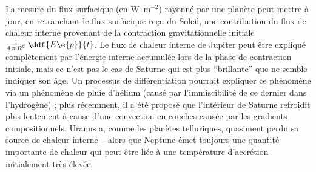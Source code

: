 \sk
La mesure du flux surfacique (en W~m$^{-2}$) 
rayonné par une planète peut mettre à jour, en retranchant 
le flux surfacique reçu du Soleil, une contribution 
du flux de chaleur interne provenant de la contraction
gravitationnelle initiale~$\frac{1}{4\,\pi\,R^2}\,\ddf{E\e{p}}{t}$.
Le flux de chaleur interne de Jupiter peut être
expliqué complètement par l'énergie interne accumulée lors de la phase
de contraction initiale, mais ce n'est pas le cas de Saturne
qui est plus ``brillante'' que ne semble indiquer son âge.
Un processus de différentiation pourrait expliquer ce phénomène
via un phénomène de pluie d'hélium (causé par l'immiscibilité
de ce dernier dans l'hydrogène) ; plus récemment, il a été
proposé que l'intérieur de Saturne refroidit plus lentement
à cause d'une convection en couches causée par les
gradients compositionnels.
Uranus a, comme les planètes telluriques,
quasiment perdu sa source de chaleur interne -- alors
que Neptune émet toujours une quantité importante
de chaleur qui peut être liée à une température d'accrétion initialement très élevée.







